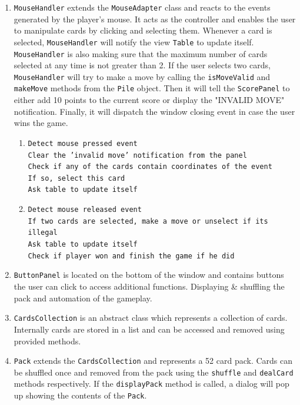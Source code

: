 \documentclass[a4paper, 11pt, titlepage]{article}
\begin{document}
\begin{enumerate}
	\item \texttt{MouseHandler} extends the \texttt{MouseAdapter} class and reacts to
		the events generated by the player's mouse. It acts as the controller and enables the 
		user to manipulate cards by clicking and selecting them. Whenever a card is 
		selected, \texttt{MouseHandler} will notify the view \texttt{Table} to update 
		itself. \texttt{MouseHandler} is also making sure that the maximum number of 
		cards selected at any time is not greater than 2. If the user selects two cards, 
		\texttt{MouseHandler} will try to make a move by calling the \texttt{isMoveValid}
		 and \texttt{makeMove} methods from the \texttt{Pile} object. Then it will 
		 tell the \texttt{ScorePanel} to either add 10 points to the current score or
		 display the "INVALID MOVE" notification. Finally, it will dispatch the window 
		 closing event in case the user wins the game.
		 \begin{enumerate}
			 \item \texttt{Detect mouse pressed event\\
				Clear the 'invalid move' notification from the panel\\
				Check if any of the cards contain coordinates of the event\\
				If so, select this card\\
				Ask table to update itself
				}
			\item \texttt{Detect mouse released event\\
				If two cards are selected, make a move or unselect if its illegal\\
				Ask table to update itself\\
				Check if player won and finish the game if he did
				}
		\end{enumerate} 
		
	\item \texttt{ButtonPanel} is located on the bottom of the window and contains
		buttons the user can click to access additional functions. Displaying
		\& shuffling the pack and automation of the gameplay. 
		
	\item \texttt{CardsCollection} is an abstract class which represents a collection of 
		cards. Internally cards are stored in a list and can be accessed and removed 
		using provided methods.
		
	\item \texttt{Pack} extends the \texttt{CardsCollection} and represents a 52 card 
		pack. Cards can be shuffled once and removed from the pack using the 
		\texttt{shuffle} and \texttt{dealCard} methods respectively. If the 
		\texttt{displayPack} method is called, a dialog will pop up showing the contents 
		of the \texttt{Pack}.
	

\end{enumerate}
\end{document}
